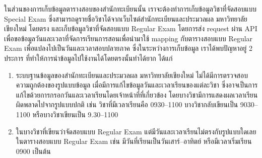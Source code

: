 ในส่วนของการเก็บข้อมูลตารางสอบของสำนักทะเบียนนั้น เราจะต้องทำการเก็บข้อมูลวิชาที่จัดสอบแบบ Special Exam ซึ่งสามารถดูรายชื่อวิชาได้จากเว็บไซต์สำนักทะเบียนและประมวลผล มหาวิทยาลัยเชียงใหม่ โดยตรง
และเก็บข้อมูลวิชาที่จัดสอบแบบ Regular Exam โดยการส่ง request ผ่าน API เพื่อขอข้อมูลวันและเวลาที่จัดการเรียนการสอนเพื่อนำมาใช้ mapping กับตารางสอบแบบ Regular Exam เพื่อแปลงไปเป็นวันและเวลาสอบปลายภาค
ซึ่งในระหว่างการเก็บข้อมูล เราได้พบปัญหาอยู่ 2 ประการ ที่ทำให้การนำข้อมูลไปใช้งานได้โดยตรงนั้นทำได้ยาก ได้แก่
\begin{enumerate}[label=(\arabic*)]
\item ระบบฐานข้อมูลของสำนักทะเบียนและประมวลผล มหาวิทยาลัยเชียงใหม่ 
ไม่ได้มีการตรวจสอบความถูกต้องของรูปแบบข้อมูล เมื่อมีการแก้ไขข้อมูลวันและเวลาเรียนของแต่ละวิชา ซึ่งอาจเป็นการแก้ไขด้วยการกรอกวันและเวลาเรียนโดยเจ้าหน้าที่ที่เกี่ยวข้อง โดยบางวิชามีการแสดงผลเวลาเรียนผิดพลาดไปจากรูปแบบปกติ
เช่น วิชาที่มีเวลาเรียนคือ 0930--1100 บางวิชากลับเขียนเป็น 9030--1100 หรือบางวิชาเขียนเป็น 9.30--1100
\item ในบางวิชาที่เขียนว่าจัดสอบแบบ Regular Exam แต่มีวันและเวลาเรียนไม่ตรงกับรูปแบบใดเลยในตารางสอบแบบ Regular Exam
เช่น มีวันที่เรียนเป็นวันเสาร์--อาทิตย์ หรือมีเวลาเริ่มเรียน 0900 เป็นต้น
\end{enumerate}

